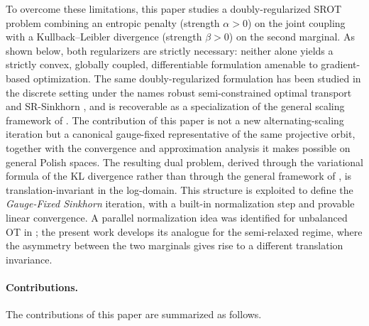\documentclass{article}
\begin{document}
To overcome these limitations, this paper studies a doubly-regularized SROT problem
combining an entropic penalty (strength $\alpha > 0$) on the joint coupling with a
Kullback--Leibler divergence (strength $\beta > 0$) on the second marginal. As shown
below, both regularizers are strictly necessary: neither alone yields a strictly convex,
globally coupled, differentiable formulation amenable to gradient-based optimization.
The same doubly-regularized formulation has been studied in the discrete setting under
the names robust semi-constrained optimal transport \cite{le2021robust} and SR-Sinkhorn
\cite{fukunaga2022convergence}, and is recoverable as a specialization of the general
scaling framework of \cite{chizat2018scaling}. The contribution of this paper is not a
new alternating-scaling iteration but a canonical gauge-fixed representative of the same
projective orbit, together with the convergence and approximation analysis it makes
possible on general Polish spaces. The resulting dual problem, derived through the
variational formula of the KL divergence rather than through the general framework of
\cite{chizat2018scaling}, is translation-invariant in the log-domain. This structure is
exploited to define the \emph{Gauge-Fixed Sinkhorn} iteration, with a built-in
normalization step and provable linear convergence. A parallel normalization idea was
identified for unbalanced OT in \cite{sejourne2022faster}; the present work develops its
analogue for the semi-relaxed regime, where the asymmetry between the two marginals
gives rise to a different translation invariance.

\paragraph{Contributions.} The contributions of this paper are summarized as follows.
\end{document}
